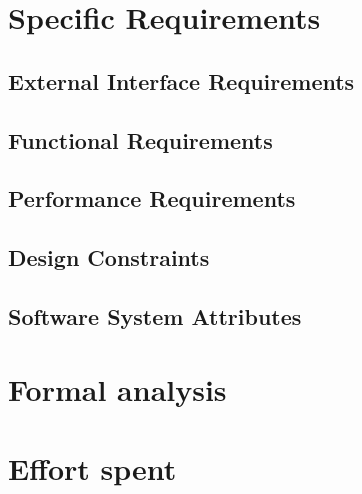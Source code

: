 \documentclass[a4paper,oneside,11pt]{article}
\begin{document}
    \newpage
    \section{Specific Requirements}
        \subsection{External Interface Requirements}
            
        \subsection{Functional Requirements}
            
        \subsection{Performance Requirements}
            
        \subsection{Design Constraints}
            
        \subsection{Software System Attributes}
            

    \section{Formal analysis}
        

    \newpage

    \section{Effort spent}
        
            
\end{document}
